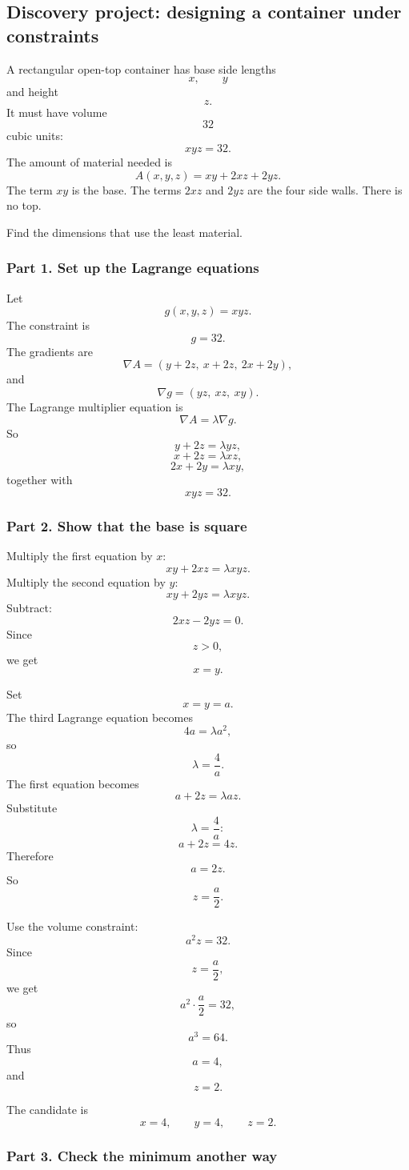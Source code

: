 \subsection{Discovery project: designing a container under constraints}

A rectangular open-top container has base side lengths
\[
    x,\qquad y
\]
and height
\[
    z.
\]
It must have volume
\[
    32
\]
cubic units:
\[
    xyz=32.
\]
The amount of material needed is
\[
    A(x,y,z)=xy+2xz+2yz.
\]
The term \(xy\) is the base.  The terms \(2xz\) and \(2yz\) are the four side walls.
There is no top.

Find the dimensions that use the least material.

\subsubsection*{Part 1. Set up the Lagrange equations}

Let
\[
    g(x,y,z)=xyz.
\]
The constraint is
\[
    g=32.
\]
The gradients are
\[
    \nabla A=(y+2z,\ x+2z,\ 2x+2y),
\]
and
\[
    \nabla g=(yz,\ xz,\ xy).
\]
The Lagrange multiplier equation is
\[
    \nabla A=\lambda\nabla g.
\]
So
\[
    y+2z=\lambda yz,
\]
\[
    x+2z=\lambda xz,
\]
\[
    2x+2y=\lambda xy,
\]
together with
\[
    xyz=32.
\]

\subsubsection*{Part 2. Show that the base is square}

Multiply the first equation by \(x\):
\[
    xy+2xz=\lambda xyz.
\]
Multiply the second equation by \(y\):
\[
    xy+2yz=\lambda xyz.
\]
Subtract:
\[
    2xz-2yz=0.
\]
Since
\[
    z>0,
\]
we get
\[
\boxed{
    x=y.
}
\]

Set
\[
    x=y=a.
\]
The third Lagrange equation becomes
\[
    4a=\lambda a^2,
\]
so
\[
    \lambda=\frac4a.
\]
The first equation becomes
\[
    a+2z=\lambda az.
\]
Substitute
\[
    \lambda=\frac4a:
\]
\[
    a+2z=4z.
\]
Therefore
\[
\boxed{
    a=2z.
}
\]
So
\[
    z=\frac a2.
\]

Use the volume constraint:
\[
    a^2z=32.
\]
Since
\[
    z=\frac a2,
\]
we get
\[
    a^2\cdot\frac a2=32,
\]
so
\[
    a^3=64.
\]
Thus
\[
    a=4,
\]
and
\[
    z=2.
\]

The candidate is
\[
\boxed{
    x=4,\qquad y=4,\qquad z=2.
}
\]

\subsubsection*{Part 3. Check the minimum another way}

